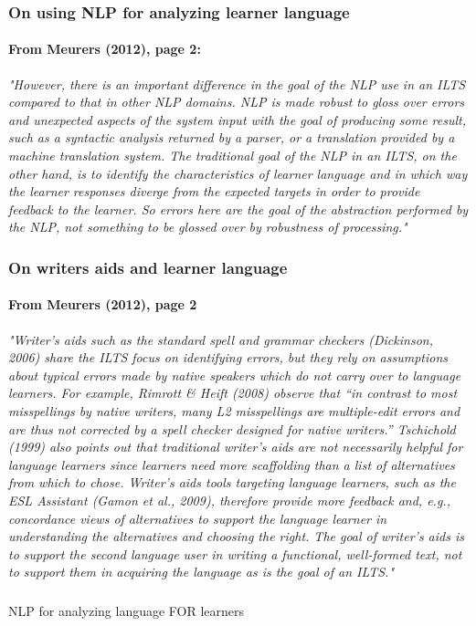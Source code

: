 \documentclass{beamer}
\begin{document}
\begin{frame}
\frametitle{On using NLP for analyzing learner language}
\framesubtitle{From Meurers (2012), page 2:}
\textit{"However, there is an important difference in the goal of the NLP use in an ILTS compared to
that in other NLP domains. NLP is made robust to gloss over errors and unexpected aspects of
the system input with the goal of producing some result, such as a syntactic analysis returned
by a parser, or a translation provided by a machine translation system. The traditional goal of
the NLP in an ILTS, on the other hand, is to identify the characteristics of learner language
and in which way the learner responses diverge from the expected targets in order to provide
feedback to the learner. So errors here are the goal of the abstraction performed by the NLP,
not something to be glossed over by robustness of processing."}
\end{frame}

\begin{frame}
\frametitle{On writers aids and learner language}
\framesubtitle{From Meurers (2012), page 2} \small
\textit{"Writer’s aids such as the standard spell and grammar checkers (Dickinson, 2006) share the
ILTS focus on identifying errors, but they rely on assumptions about typical errors made
by native speakers which do not carry over to language learners. For example, Rimrott
\& Heift (2008) observe that “in contrast to most misspellings by native writers, many L2
misspellings are multiple-edit errors and are thus not corrected by a spell checker designed
for native writers.” Tschichold (1999) also points out that traditional writer’s aids are not
necessarily helpful for language learners since learners need more scaffolding than a list of
alternatives from which to chose. Writer’s aids tools targeting language learners, such as the
ESL Assistant (Gamon et al., 2009), therefore provide more feedback and, e.g., concordance
views of alternatives to support the language learner in understanding the alternatives and
choosing the right. The goal of writer’s aids is to support the second language user in writing
a functional, well-formed text, not to support them in acquiring the language as is the goal of
an ILTS."}
\end{frame}

\begin{frame}
\frametitle{}
\Large NLP for analyzing language FOR learners
\end{frame}
\end{document}
